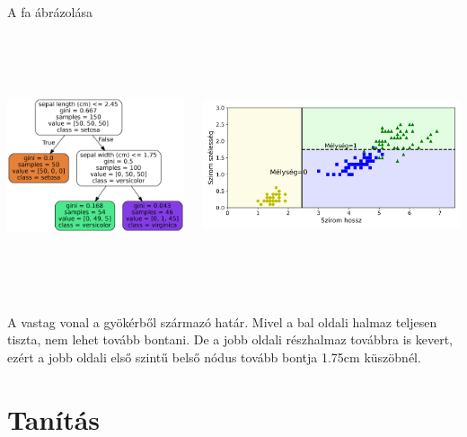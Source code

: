 \documentclass[english, aspectratio=169]{beamer}
\begin{document}
\begin{frame}{A fa ábrázolása}
\begin{columns}
\begin{column}{.4\textwidth}
\begin{center}
\includegraphics[width=5.5cm, height=7cm, keepaspectratio]{graphs/decision_trees_4.png}
\end{center}
\end{column}
\begin{column}{.6\textwidth}
\begin{center}
\includegraphics[width=8cm, height=7cm, keepaspectratio]{images/decision_trees_2.png}
\end{center}
\end{column}
\end{columns}
\vspace{0.5cm}
A vastag vonal a gyökérből származó határ. Mivel a bal oldali halmaz teljesen tiszta, nem lehet tovább bontani. De a jobb oldali részhalmaz továbbra is kevert, ezért a jobb oldali első szintű belső nódus tovább bontja 1.75cm küszöbnél.
\end{frame}

\section{Tanítás}
\end{document}
